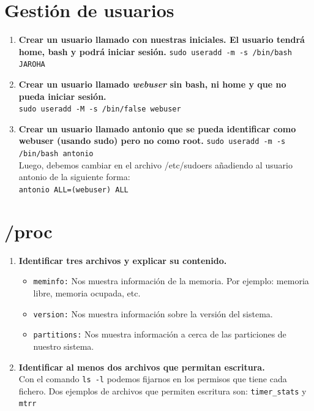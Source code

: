 \documentclass[12pt,letterpaper]{article}
\begin{document}
\section{Gestión de usuarios}
\begin{enumerate}
	\item \textbf{Crear un usuario llamado con nuestras iniciales. El usuario tendrá home, bash y podrá iniciar sesión.}
	\texttt{sudo useradd -m -s /bin/bash JAROHA}
	\item \textbf{Crear un usuario llamado \textit{webuser} sin bash, ni home y que no pueda iniciar sesión.} \\
	\texttt{sudo useradd -M -s /bin/false webuser}
	\item \textbf{Crear un usuario llamado antonio que se pueda identificar como webuser (usando sudo) pero no como root.}
	\texttt{sudo useradd -m -s /bin/bash antonio} \\
	Luego, debemos cambiar en el archivo /etc/sudoers añadiendo al usuario antonio de la siguiente forma: \\
	\texttt{antonio ALL=(webuser) ALL}
\end{enumerate}

\section{/proc}
\begin{enumerate}
	\item \textbf{Identificar tres archivos y explicar su contenido.}
	\begin{itemize}
		\item \texttt{meminfo:} Nos muestra información de la memoria. Por ejemplo: memoria libre, memoria ocupada, etc.
		\item \texttt{version:} Nos muestra información sobre la versión del sistema.
		\item \texttt{partitions:} Nos muestra información a cerca de las particiones de nuestro sistema.
	\end{itemize}
	\item \textbf{Identificar al menos dos archivos que permitan escritura.} \\
	Con el comando \texttt{ls -l} podemos fijarnos en los permisos que tiene cada fichero. Dos ejemplos de archivos que permiten escritura son: \texttt{timer\_stats} y \texttt{mtrr}
\end{enumerate}
\end{document}
